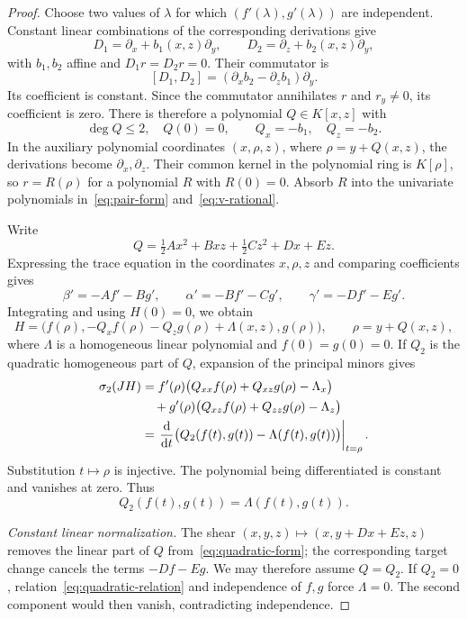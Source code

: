 \documentclass[10pt,a4paper]{amsart}
\newcommand{\dd}{\mathrm d}
\begin{document}
\begin{proof}
Choose two values of $\lambda$ for which $(f'(\lambda),g'(\lambda))$ are independent. Constant linear combinations of the corresponding derivations give
\[
 D_1=\partial_x+b_1(x,z)\partial_y,\qquad
 D_2=\partial_z+b_2(x,z)\partial_y,
\]
with $b_1,b_2$ affine and $D_1r=D_2r=0$. Their commutator is
\[
 [D_1,D_2]=(\partial_xb_2-\partial_zb_1)\partial_y.
\]
Its coefficient is constant. Since the commutator annihilates $r$ and $r_y\neq0$, its coefficient is zero. There is therefore a polynomial $Q\in K[x,z]$ with
\[
 \deg Q\leq2,\quad Q(0)=0,\qquad Q_x=-b_1,\quad Q_z=-b_2.
\]
In the auxiliary polynomial coordinates $(x,\rho,z)$, where $\rho=y+Q(x,z)$, the derivations become $\partial_x,\partial_z$. Their common kernel in the polynomial ring is $K[\rho]$, so $r=R(\rho)$ for a polynomial $R$ with $R(0)=0$. Absorb $R$ into the univariate polynomials in~\eqref{eq:pair-form} and~\eqref{eq:v-rational}.

Write
\[
 Q=\tfrac12Ax^2+Bxz+\tfrac12Cz^2+Dx+Ez.
\]
Expressing the trace equation in the coordinates $x,\rho,z$ and comparing coefficients gives
\[
 \beta'=-Af'-Bg',\qquad \alpha'=-Bf'-Cg',\qquad \gamma'=-Df'-Eg'.
\]
Integrating and using $H(0)=0$, we obtain
\begin{equation}\label{eq:quadratic-form}
 H=\bigl(f(\rho),-Q_xf(\rho)-Q_zg(\rho)+\Lambda(x,z),g(\rho)\bigr),
 \qquad \rho=y+Q(x,z),
\end{equation}
where $\Lambda$ is a homogeneous linear polynomial and $f(0)=g(0)=0$. If $Q_2$ is the quadratic homogeneous part of $Q$, expansion of the principal minors gives
\begin{align}\label{eq:quadratic-relation-derivative}
 \sigma_2(JH)
 &=f'(\rho)\bigl(Q_{xx}f(\rho)+Q_{xz}g(\rho)-\Lambda_x\bigr)\notag\\
 &\quad+g'(\rho)\bigl(Q_{xz}f(\rho)+Q_{zz}g(\rho)-\Lambda_z\bigr)\\
 &=\left.\frac{\dd}{\dd t}
 \bigl(Q_2(f(t),g(t))-\Lambda(f(t),g(t))\bigr)\right|_{t=\rho}.\notag
\end{align}
Substitution $t\mapsto \rho$ is injective. The polynomial being differentiated is constant and vanishes at zero. Thus
\begin{equation}\label{eq:quadratic-relation}
 Q_2(f(t),g(t))=\Lambda(f(t),g(t)).
\end{equation}

\smallskip\noindent\emph{Constant linear normalization.}
The shear $(x,y,z)\mapsto(x,y+Dx+Ez,z)$ removes the linear part of $Q$ from~\eqref{eq:quadratic-form}; the corresponding target change cancels the terms $-Df-Eg$. We may therefore assume $Q=Q_2$. If $Q_2=0$, relation~\eqref{eq:quadratic-relation} and independence of $f,g$ force $\Lambda=0$. The second component would then vanish, contradicting independence.


\end{proof}
\end{document}
